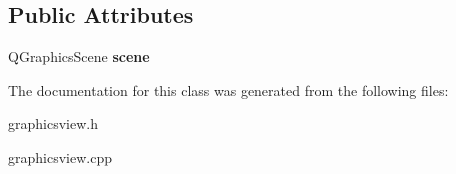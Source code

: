 \subsection*{Public Attributes}
\begin{DoxyCompactItemize}
\item 
\hypertarget{class_graphics_view_acf2fdc6e6bb10767165fed1e142655de}{Q\-Graphics\-Scene {\bfseries scene}}\label{class_graphics_view_acf2fdc6e6bb10767165fed1e142655de}

\end{DoxyCompactItemize}


The documentation for this class was generated from the following files\-:\begin{DoxyCompactItemize}
\item 
graphicsview.\-h\item 
graphicsview.\-cpp\end{DoxyCompactItemize}
